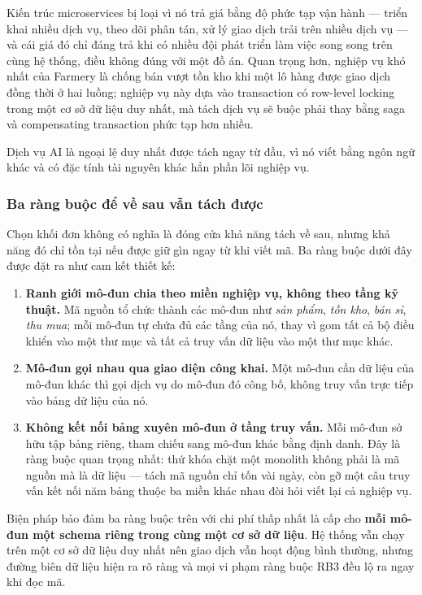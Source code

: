 Kiến trúc microservices bị loại vì nó trả giá bằng độ phức tạp vận hành --- triển khai nhiều dịch vụ, theo dõi phân tán, xử lý giao dịch trải trên nhiều dịch vụ --- và cái giá đó chỉ đáng trả khi có nhiều đội phát triển làm việc song song trên cùng hệ thống, điều không đúng với một đồ án. Quan trọng hơn, nghiệp vụ khó nhất của Farmery là chống bán vượt tồn kho khi một lô hàng được giao dịch đồng thời ở hai luồng; nghiệp vụ này dựa vào transaction có row-level locking trong một cơ sở dữ liệu duy nhất, mà tách dịch vụ sẽ buộc phải thay bằng saga và compensating transaction phức tạp hơn nhiều.

Dịch vụ AI là ngoại lệ duy nhất được tách ngay từ đầu, vì nó viết bằng ngôn ngữ khác và có đặc tính tài nguyên khác hẳn phần lõi nghiệp vụ.

\subsubsection*{Ba ràng buộc để về sau vẫn tách được}

Chọn khối đơn không có nghĩa là đóng cửa khả năng tách về sau, nhưng khả năng đó chỉ tồn tại nếu được giữ gìn ngay từ khi viết mã. Ba ràng buộc dưới đây được đặt ra như cam kết thiết kế:

\begin{enumerate}
    \item[\textbf{RB1.}] \textbf{Ranh giới mô-đun chia theo miền nghiệp vụ, không theo tầng kỹ thuật.} Mã nguồn tổ chức thành các mô-đun như \emph{sản phẩm}, \emph{tồn kho}, \emph{bán sỉ}, \emph{thu mua}; mỗi mô-đun tự chứa đủ các tầng của nó, thay vì gom tất cả bộ điều khiển vào một thư mục và tất cả truy vấn dữ liệu vào một thư mục khác.
    \item[\textbf{RB2.}] \textbf{Mô-đun gọi nhau qua giao diện công khai.} Một mô-đun cần dữ liệu của mô-đun khác thì gọi dịch vụ do mô-đun đó công bố, không truy vấn trực tiếp vào bảng dữ liệu của nó.
    \item[\textbf{RB3.}] \textbf{Không kết nối bảng xuyên mô-đun ở tầng truy vấn.} Mỗi mô-đun sở hữu tập bảng riêng, tham chiếu sang mô-đun khác bằng định danh. Đây là ràng buộc quan trọng nhất: thứ khóa chặt một monolith không phải là mã nguồn mà là dữ liệu --- tách mã nguồn chỉ tốn vài ngày, còn gỡ một câu truy vấn kết nối năm bảng thuộc ba miền khác nhau đòi hỏi viết lại cả nghiệp vụ.
\end{enumerate}

Biện pháp bảo đảm ba ràng buộc trên với chi phí thấp nhất là cấp cho \textbf{mỗi mô-đun một schema riêng trong cùng một cơ sở dữ liệu}. Hệ thống vẫn chạy trên một cơ sở dữ liệu duy nhất nên giao dịch vẫn hoạt động bình thường, nhưng đường biên dữ liệu hiện ra rõ ràng và mọi vi phạm ràng buộc RB3 đều lộ ra ngay khi đọc mã.

